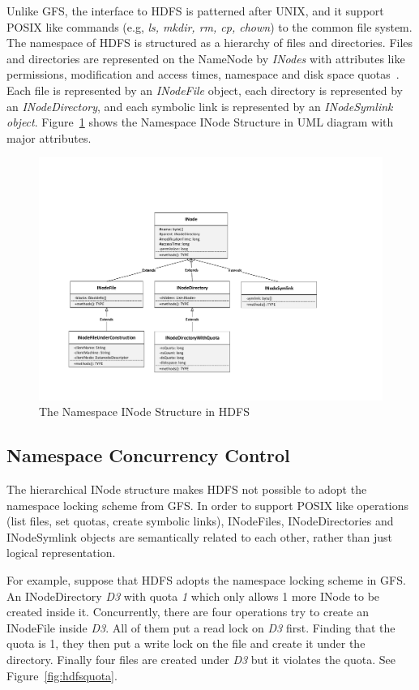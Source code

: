 Unlike GFS, the interface to HDFS is patterned after UNIX, and it support POSIX like commands (e.g, \textit{ls, mkdir, rm, cp, chown}) to the common file system. The namespace of HDFS is structured as a hierarchy of files and directories. Files and directories are represented on the NameNode by \textit{INodes} with attributes like permissions, modification and access times, namespace and disk space quotas~\cite{borthakur2008hdfs}. Each file is represented by an \textit{INodeFile} object, each directory is represented by an \textit{INodeDirectory}, and each symbolic link is represented by an \textit{INodeSymlink object}. Figure~\ref{fig:inodeuml} shows the Namespace INode Structure in UML diagram with major attributes.

\begin{figure}[h]
	\centering
	\includegraphics[width=\linewidth]{figs/INodeUML.pdf}
	\caption{The Namespace INode Structure in HDFS}
	\label{fig:inodeuml}
\end{figure}

\subsection{Namespace Concurrency Control}

\noindent The hierarchical INode structure makes HDFS not possible to adopt the namespace locking scheme from GFS. In order to support POSIX like operations (list files, set quotas, create symbolic links), INodeFiles, INodeDirectories and INodeSymlink objects are semantically related to each other, rather than just logical representation.

\noindent For example, suppose that HDFS adopts the namespace locking scheme in GFS. An INodeDirectory \textit{D3} with quota \textit{1} which only allows 1 more INode to be created inside it. Concurrently, there are four operations try to create an INodeFile inside \textit{D3}. All of them put a read lock on \textit{D3} first. Finding that the quota is 1, they then put a write lock on the file and create it under the directory. Finally four files are created under \textit{D3} but it violates the quota. See Figure~\ref{fig:hdfsquota}.

